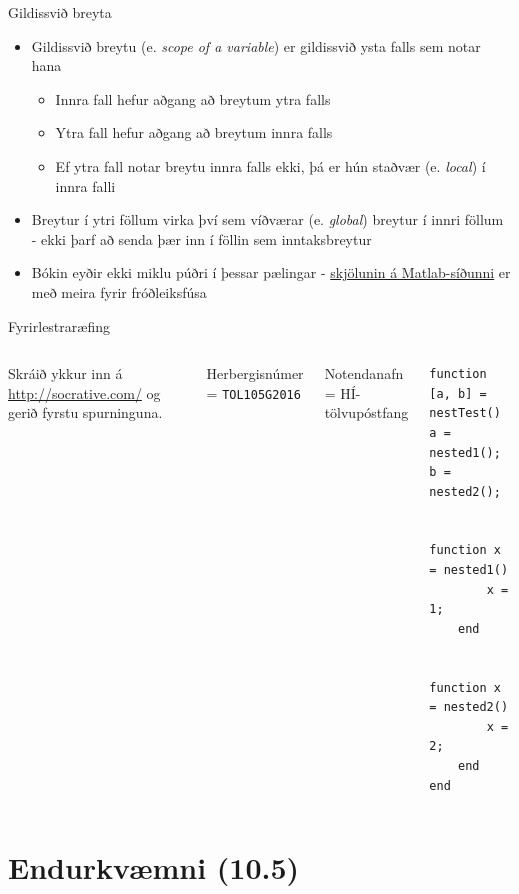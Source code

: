 \documentclass{beamer}
\begin{document}
\begin{frame}{Gildissvið breyta}
\vspace{\baselineskip}
\begin{itemize}
 \item Gildissvið breytu (e. \emph{scope of a variable}) er gildissvið ysta falls sem notar hana
 \begin{itemize}
  \item Innra fall hefur aðgang að breytum ytra falls
  \item Ytra fall hefur aðgang að breytum innra falls
  \item Ef ytra fall notar breytu innra falls ekki, þá er hún staðvær (e. \emph{local}) í innra falli
 \end{itemize}
 \item Breytur í ytri föllum virka því sem víðværar (e. \emph{global}) breytur í innri föllum - ekki þarf að senda þær inn í föllin sem inntaksbreytur
 \item Bókin eyðir ekki miklu púðri í þessar pælingar - \href{http://se.mathworks.com/help/matlab/matlab_prog/nested-functions.html?refresh=true}{skjölunin á Matlab-síðunni} er með meira fyrir fróðleiksfúsa
\end{itemize}
\end{frame}

\begin{frame}[fragile]{Fyrirlestraræfing}
\begin{columns}
Skráið ykkur inn á \url{http://socrative.com/} og gerið fyrstu spurninguna.

Herbergisnúmer = \texttt{TOL105G2016}

Notendanafn = HÍ-tölvupóstfang
\begin{verbatim}
function [a, b] = nestTest()
a = nested1();
b = nested2();

    function x = nested1()
        x = 1;
    end

    function x = nested2()
        x = 2;
    end
end
\end{verbatim}

\end{columns}
\end{frame}

\section{Endurkvæmni (10.5)}
\end{document}
